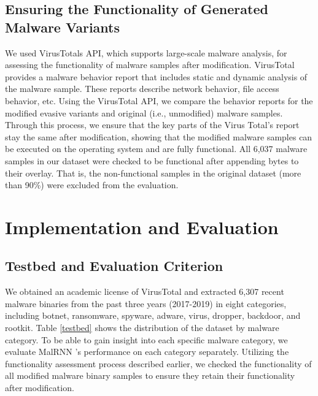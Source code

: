 \documentclass[letterpaper]{article}
\newcommand{\malrnn}{M\lowercase{a}lRNN }
\begin{document}
\subsection{Ensuring the Functionality of Generated Malware Variants} \label{ensure_func}
We used VirusTotals API, which supports large-scale malware analysis, for assessing the functionality of malware samples after modification. VirusTotal provides a malware behavior report that includes static and dynamic analysis of the malware sample. These reports describe network behavior, file access behavior, etc. Using the VirusTotal API, we compare the behavior reports for the modified evasive variants and original (i.e., unmodified) malware samples. Through this process, we ensure that the key parts of the Virus Total's report stay the same after modification, showing that the modified malware samples can be executed on the operating system and are fully functional. All 6,037 malware samples in our dataset were checked to be functional after appending bytes to their overlay. That is, the non-functional samples in the original dataset (more than 90\%) were excluded from the evaluation.

\section{Implementation and Evaluation}
\label{evaluation}
\subsection{Testbed and Evaluation Criterion}
\label{evaluation_criteria}
We obtained an academic license of VirusTotal and extracted 6,307 recent malware binaries from the past three years (2017-2019) in eight categories, including botnet, ransomware, spyware, adware, virus, dropper, backdoor, and rootkit. Table \ref{testbed} shows the distribution of the dataset by malware category. To be able to gain insight into each specific malware category, we evaluate \malrnn's performance on each category separately.
Utilizing the functionality assessment process described earlier, we checked the functionality of all modified malware binary samples to ensure they retain their functionality after modification.
\end{document}
